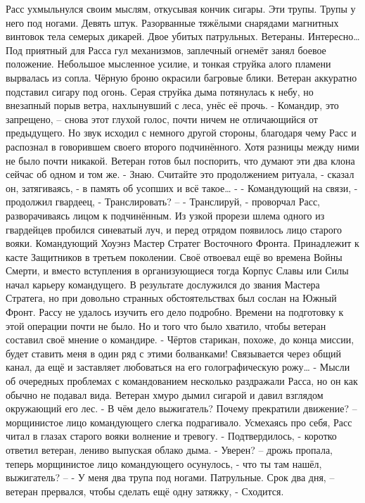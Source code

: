 \documentclass[a4paper, 12pt]{report}
\begin{document}
	Расс ухмыльнулся своим мыслям, откусывая кончик сигары. Эти трупы. Трупы у него под ногами. Девять штук. Разорванные тяжёлыми снарядами магнитных винтовок тела семерых дикарей. Двое убитых патрульных. Ветераны. Интересно… 
Под приятный для Расса гул механизмов, заплечный огнемёт занял боевое положение. Небольшое мысленное усилие, и тонкая струйка алого пламени вырвалась из сопла. Чёрную броню окрасили багровые блики. Ветеран аккуратно подставил сигару под огонь. Серая струйка дыма потянулась к небу, но внезапный порыв ветра, нахлынувший с леса, унёс её прочь.
	- Командир, это запрещено, – снова этот глухой голос, почти ничем не отличающийся от предыдущего. Но звук исходил с немного другой стороны, благодаря чему Расс и распознал в говорившем своего второго подчинённого. Хотя разницы между ними не было почти никакой. Ветеран готов был поспорить, что думают эти два клона сейчас об одном и том же.
	- Знаю. Считайте это продолжением ритуала, - сказал он, затягиваясь, - в память об усопших и всё такое… -
- Командующий на связи, - продолжил гвардеец, - Транслировать? –
	- Транслируй, - проворчал Расс, разворачиваясь лицом к подчинённым. Из узкой прорези шлема одного из гвардейцев пробился синеватый луч, и перед отрядом появилось лицо старого вояки.
	Командующий Хоуэнз Мастер Стратег Восточного Фронта. Принадлежит к касте Защитников в третьем поколении. Своё отвоевал ещё во времена Войны Смерти, и вместо вступления в организующиеся тогда Корпус Славы или Силы начал карьеру командущего. В результате дослужился до звания Мастера Стратега, но при довольно странных обстоятельствах был сослан на Южный Фронт. Рассу не удалось изучить его дело подробно. Времени на подготовку к этой операции почти не было. Но и того что было хватило, чтобы ветеран составил своё мнение о командире.
	- Чёртов старикан, похоже, до конца миссии, будет ставить меня в один ряд с этими болванками! Связывается через общий канал, да ещё и заставляет любоваться на его голографическую рожу… - Мысли об очередных проблемах с командованием несколько раздражали Расса, но он как обычно не подавал вида. Ветеран хмуро дымил сигарой и давил взглядом окружающий его лес.
- В чём дело выжигатель? Почему прекратили движение? – морщинистое лицо командующего слегка подрагивало. Усмехаясь про себя, Расс читал в глазах старого вояки волнение и тревогу.
	- Подтвердилось, - коротко ответил ветеран, лениво выпуская облако дыма.
	- Уверен? – дрожь пропала, теперь морщинистое лицо командующего осунулось, - что ты там нашёл, выжигатель? –
	- У меня два трупа под ногами. Патрульные. Срок два дня, – ветеран прервался, чтобы сделать ещё одну затяжку, - Сходится.
\end{document}
